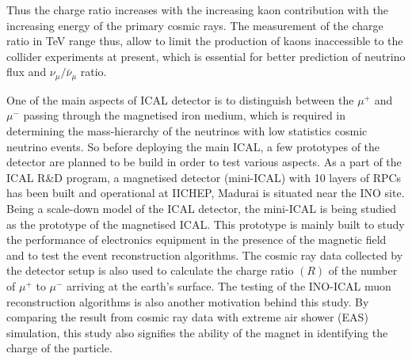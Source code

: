 Thus the charge ratio increases with the increasing kaon contribution
with the increasing energy of the primary cosmic rays.
The measurement of the charge ratio in TeV range thus, allow to limit
the production of kaons inaccessible to the collider experiments
at present, which is essential for better prediction of neutrino
flux and $\nu_{\mu}/\bar{\nu}_{\mu}$ ratio.

One of the main aspects of ICAL detector is to distinguish between
the $\mu^{+}$ and $\mu^{-}$ passing through the magnetised iron
medium, which is required in determining the mass-hierarchy of
the neutrinos with low statistics cosmic neutrino events.
So before deploying the main ICAL, a few prototypes
of the detector are planned to be build in order to test various
aspects.
As a part of the ICAL R\&D program, a magnetised detector (mini-ICAL)
with 10 layers of RPCs has been built and operational at IICHEP,
Madurai is situated near the INO site. Being a scale-down model of the
ICAL detector, the mini-ICAL is being studied as the prototype of
the magnetised ICAL. This prototype is mainly built to study the
performance of electronics equipment in the presence of the magnetic
field and to test the event reconstruction algorithms.
The cosmic ray data collected by the
detector setup is also used to calculate the charge ratio $(R)$
of the number of $\mu^{+}$ to $\mu^{-}$ arriving at the earth's surface.
The testing of the INO-ICAL muon reconstruction algorithms is also
another motivation behind this study.
By comparing the result from cosmic ray data with extreme
air shower (EAS) simulation, this study also signifies the ability of
the magnet in identifying the charge of the particle.

